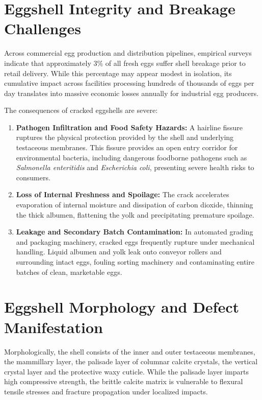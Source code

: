 \documentclass[12pt,a4paper]{report}
\begin{document}
\section{Eggshell Integrity and Breakage Challenges}

Across commercial egg production and distribution pipelines, empirical surveys indicate that approximately 3\% of all fresh eggs suffer shell breakage prior to retail delivery. While this percentage may appear modest in isolation, its cumulative impact across facilities processing hundreds of thousands of eggs per day translates into massive economic losses annually for industrial egg producers.

The consequences of cracked eggshells are severe:
\begin{enumerate}[label=\arabic*.]
    \item \textbf{Pathogen Infiltration and Food Safety Hazards:} A hairline fissure ruptures the physical protection provided by the shell and underlying testaceous membranes. This fissure provides an open entry corridor for environmental bacteria, including dangerous foodborne pathogens such as \textit{Salmonella enteritidis} and \textit{Escherichia coli}, presenting severe health risks to consumers.
    \item \textbf{Loss of Internal Freshness and Spoilage:} The crack accelerates evaporation of internal moisture and dissipation of carbon dioxide, thinning the thick albumen, flattening the yolk and precipitating premature spoilage.
    \item \textbf{Leakage and Secondary Batch Contamination:} In automated grading and packaging machinery, cracked eggs frequently rupture under mechanical handling. Liquid albumen and yolk leak onto conveyor rollers and surrounding intact eggs, fouling sorting machinery and contaminating entire batches of clean, marketable eggs.
\end{enumerate}

\section{Eggshell Morphology and Defect Manifestation}

Morphologically, the shell consists of the inner and outer testaceous membranes, the mammillary layer, the palisade layer of columnar calcite crystals, the vertical crystal layer and the protective waxy cuticle. While the palisade layer imparts high compressive strength, the brittle calcite matrix is vulnerable to flexural tensile stresses and fracture propagation under localized impacts.
\end{document}
